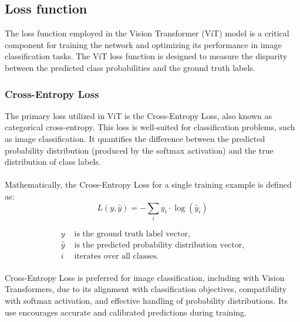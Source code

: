 \subsection{Loss function }
The loss function employed in the Vision Transformer (ViT) model is a critical component for training the network and optimizing its performance in image classification tasks. The ViT loss function is designed to measure the disparity between the predicted class probabilities and the ground truth labels.


\subsubsection{Cross-Entropy Loss}
The primary loss utilized in ViT is the Cross-Entropy Loss, also known as categorical cross-entropy. This loss is well-suited for classification problems, such as image classification. It quantifies the difference between the predicted probability distribution (produced by the softmax activation) and the true distribution of class labels.
\\
\\
Mathematically, the Cross-Entropy Loss for a single training example is defined as:
\\

\[
L(y, \hat{y}) = -\sum_i y_i \cdot \log(\hat{y}_i)
\]

\begin{align*}
y & \text{ is the ground truth label vector,} \\
\hat{y} & \text{ is the predicted probability distribution vector,} \\
i & \text{ iterates over all classes.}
\end{align*}
\\
Cross-Entropy Loss is preferred for image classification, including with Vision Transformers, due to its alignment with classification objectives, compatibility with softmax activation, and effective handling of probability distributions. Its use encourages accurate and calibrated predictions during training.
